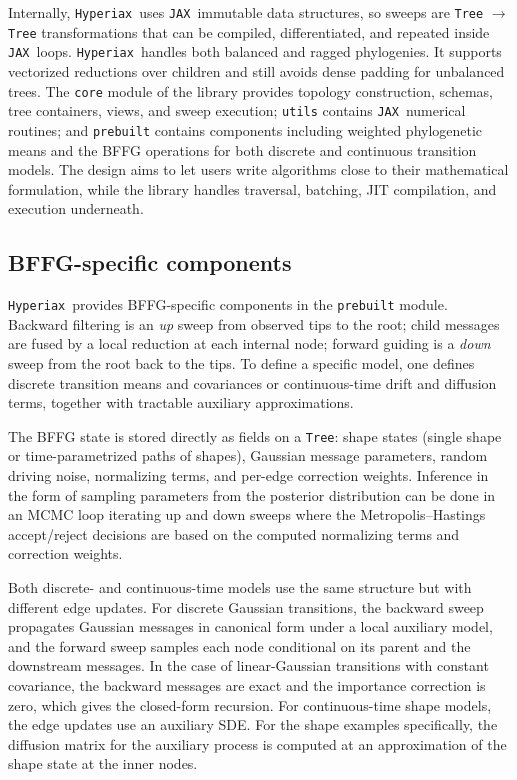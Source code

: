 \documentclass[unnumsec,webpdf,contemporary,large]{oup-authoring-template}
\newcommand{\Hyperiax}{\texttt{Hyperiax}}
\newcommand{\JAX}{\texttt{JAX}}
\begin{document}
Internally, \Hyperiax\ uses \JAX\ immutable data structures, so sweeps are \texttt{Tree} $\to$ \texttt{Tree} transformations that can be compiled, differentiated, and repeated inside \JAX\ loops. \Hyperiax\  handles both balanced and ragged phylogenies. It supports vectorized reductions over children and still avoids dense padding for unbalanced trees. The \texttt{core} module of the library provides topology construction, schemas, tree containers, views, and sweep execution; \texttt{utils} contains \JAX\ numerical routines; and \texttt{prebuilt} contains components including weighted phylogenetic means and the BFFG operations for both discrete and continuous transition models. The design aims to let users write algorithms close to their mathematical formulation, while the library handles traversal, batching, JIT compilation, and execution underneath.

\subsection{BFFG-specific components}
\Hyperiax\ provides BFFG-specific components in the \texttt{prebuilt} module. Backward filtering is an \emph{up} sweep from observed tips to the root; child messages are fused by a local reduction at each internal node; forward guiding is a \emph{down} sweep from the root back to the tips. To define a specific model, one defines discrete transition means and covariances or continuous-time drift and diffusion terms, together with tractable auxiliary approximations.

The BFFG state is stored directly as fields on a \texttt{Tree}: shape states (single shape or time-parametrized paths of shapes), Gaussian message parameters, random driving noise, normalizing terms, and per-edge correction weights. Inference in the form of sampling parameters from the posterior distribution can be done in an MCMC loop iterating up and down sweeps where the Metropolis--Hastings accept/reject decisions are based on the computed normalizing terms and correction weights.

Both discrete- and continuous-time models use the same structure but with different edge updates. For discrete Gaussian transitions, the backward sweep propagates Gaussian messages in canonical form under a local auxiliary model, and the forward sweep samples each node conditional on its parent and the downstream messages. In the case of linear-Gaussian transitions with constant covariance, the backward messages are exact and the importance correction is zero, which gives the closed-form recursion. For continuous-time shape models, the edge updates use an auxiliary SDE. For the shape examples specifically, the diffusion matrix for the auxiliary process is computed at an approximation of the shape state at the inner nodes.
\end{document}
